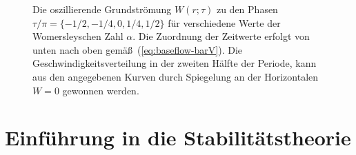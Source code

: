 \documentclass[10pt,a5paper,oneside,draft]{book}
\numberwithin{equation}{chapter}
\begin{document}
\begin{figure}[ htbp ]
\begin{center}
\begin{picture}
	\end{picture}
	\caption{\label{fig:baseflow}Die oszillierende Grundstr\"omung $W(r;\tau)$ zu den Phasen $\tau/\pi = \{-1/2,-1/4,0,1/4,1/2\}$ f\"ur verschiedene Werte der Womersleyschen Zahl $\alpha$. Die Zuordnung der Zeitwerte erfolgt von unten nach oben gem\"a\ss\ (\mbox{\ref{eq:baseflow-barV}}). Die Geschwindigkeitsverteilung in der zweiten H\"alfte der Periode, kann aus den angegebenen Kurven durch Spiegelung an der Horizontalen $W=0$ gewonnen werden.}
	\end{center}
\end{figure}

\chapter{Einf\"uhrung in die Stabilit\"atstheorie}\label{sec:stabilitaetstheorie}
\pagestyle{main}
\end{document}
